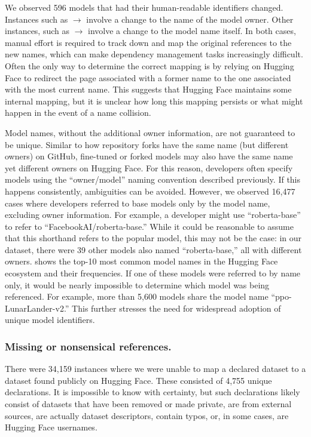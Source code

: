 We observed 596 models that had their human-readable identifiers changed. %
Instances such as  $\rightarrow$  involve a change to the name of the model owner.  Other instances, such as  $\rightarrow$  involve a change to the model name itself. In both cases, manual effort is required to track down and map the original references to the new names, which can make dependency management tasks increasingly difficult.  Often the only way to determine the correct mapping is by relying on Hugging Face to redirect the page associated with a former name to the one associated with the most current name.  This suggests that Hugging Face maintains some internal mapping, but it is unclear how long this mapping persists or what might happen in the event of a name collision.



Model names, without the additional owner information, are not guaranteed to be unique.  Similar to how repository forks have the same name (but different owners) on GitHub, fine-tuned or forked models may also have the same name yet different owners on Hugging Face.  For this reason, developers often specify models using the ``owner/model'' naming convention described previously. If this happens consistently, ambiguities can be avoided. However, we observed 16,477 cases where developers referred to base models only by the model name, excluding owner information. For example, a developer might use ``roberta-base'' to refer to ``FacebookAI/roberta-base.''  While it could be reasonable to assume that this shorthand refers to the popular model, this may not be the case: in our dataset, there were 39 other models also named ``roberta-base,'' all with different owners.   shows the top-10 most common model names in the Hugging Face ecosystem and their frequencies.  If one of these models were referred to by name only, it would be nearly impossible to determine which model was being referenced. For example, more than 5,600 models share the model name ``ppo-LunarLander-v2.''  This further stresses the need for widespread adoption of unique model identifiers. %

\subsubsection{Missing or nonsensical references.} 
\label{sec:missing_refs}
There were 34,159 instances where we were unable to map a declared dataset to a dataset found publicly on Hugging Face.  These consisted of 4,755 unique declarations.  It is impossible to know with certainty, but such declarations likely consist of datasets that have been removed or made private, are from external sources, are actually dataset descriptors, contain typos, or, in some cases, are Hugging Face usernames. 

